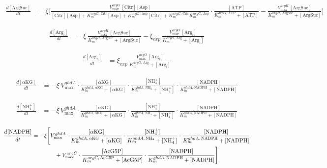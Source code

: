 \begin{align}
\frac{d[\mathrm{ArgSuc}]}{dt}
  &= \xi \Biggl[
      \frac{V_{\max}^{argG}\,[\mathrm{Citr}][\mathrm{Asp}]}
           {[\mathrm{Citr}][\mathrm{Asp}]
            +K_m^{argG,\,\mathrm{Citr}}[\mathrm{Asp}]
            +K_m^{argG,\,\mathrm{Asp}}[\mathrm{Citr}]
            +K_m^{argG,\,\mathrm{Citr}}K_m^{argG,\,\mathrm{Asp}}}
      \cdot\frac{[\mathrm{ATP}]}{K_m^{argG,\,\mathrm{ATP}}+[\mathrm{ATP}]}
      -
      \frac{V_{\max}^{argH}\,[\mathrm{ArgSuc}]}{K_m^{argH,\,\mathrm{ArgSuc}}+[\mathrm{ArgSuc}]}
    \Biggr]
\label{eq:dArgSuc}
\end{align}

\begin{align}
\frac{d[\mathrm{Arg}_i]}{dt}
  &= \xi\,\frac{V_{\max}^{argH}\,[\mathrm{ArgSuc}]}{K_m^{argH,\,\mathrm{ArgSuc}}+[\mathrm{ArgSuc}]}
    -\xi_{exp}\,\frac{V_{\max}^{argO}\,[\mathrm{Arg}_i]}{K_m^{argO,\,\mathrm{Arg}}+[\mathrm{Arg}_i]}
\label{eq:dArgi}
\end{align}

\begin{align}
\frac{d[\mathrm{Arg}_e]}{dt}
  &= \xi_{exp}\,\frac{V_{\max}^{argO}\,[\mathrm{Arg}_i]}{K_m^{argO,\,\mathrm{Arg}}+[\mathrm{Arg}_i]}
\label{eq:dArge}
\end{align}


\begin{align}
\frac{d[\alpha\mathrm{KG}]}{dt}
  &= -\xi\,
      V_{\max}^{ghdA}
      \cdot\frac{[\alpha\mathrm{KG}]}{K_m^{ghdA,\,\alpha\mathrm{KG}}+[\alpha\mathrm{KG}]}
      \cdot\frac{[\mathrm{NH}_4^+]}{K_m^{ghdA,\,\mathrm{NH}_4}+[\mathrm{NH}_4^+]}
      \cdot\frac{[\mathrm{NADPH}]}{K_m^{ghdA,\,\mathrm{NADPH}}+[\mathrm{NADPH}]}
\label{eq:daKG}
\end{align}

\begin{align}
\frac{d[\mathrm{NH}_4^+]}{dt}
  &= -\xi\,
      V_{\max}^{ghdA}
      \cdot\frac{[\alpha\mathrm{KG}]}{K_m^{ghdA,\,\alpha\mathrm{KG}}+[\alpha\mathrm{KG}]}
      \cdot\frac{[\mathrm{NH}_4^+]}{K_m^{ghdA,\,\mathrm{NH}_4}+[\mathrm{NH}_4^+]}
      \cdot\frac{[\mathrm{NADPH}]}{K_m^{ghdA,\,\mathrm{NADPH}}+[\mathrm{NADPH}]}
\label{eq:dNH4}
\end{align}

\begin{align}
\frac{d[\mathrm{NADPH}]}{dt}
  &= -\xi \Biggl[
      V_{\max}^{ghdA}
      \cdot\frac{[\alpha\mathrm{KG}]}{K_m^{ghdA,\,\alpha\mathrm{KG}}+[\alpha\mathrm{KG}]}
      \cdot\frac{[\mathrm{NH}_4^+]}{K_m^{ghdA,\,\mathrm{NH}_4}+[\mathrm{NH}_4^+]}
      \cdot\frac{[\mathrm{NADPH}]}{K_m^{ghdA,\,\mathrm{NADPH}}+[\mathrm{NADPH}]}
  \notag\\
  &\qquad\qquad +
      V_{\max}^{argC}
      \cdot\frac{[\mathrm{AcG5P}]}{K_m^{argC,\,\mathrm{AcG5P}}+[\mathrm{AcG5P}]}
      \cdot\frac{[\mathrm{NADPH}]}{K_m^{ghdA,\,\mathrm{NADPH}}+[\mathrm{NADPH}]}
    \Biggr]
\label{eq:dNADPH}
\end{align}

